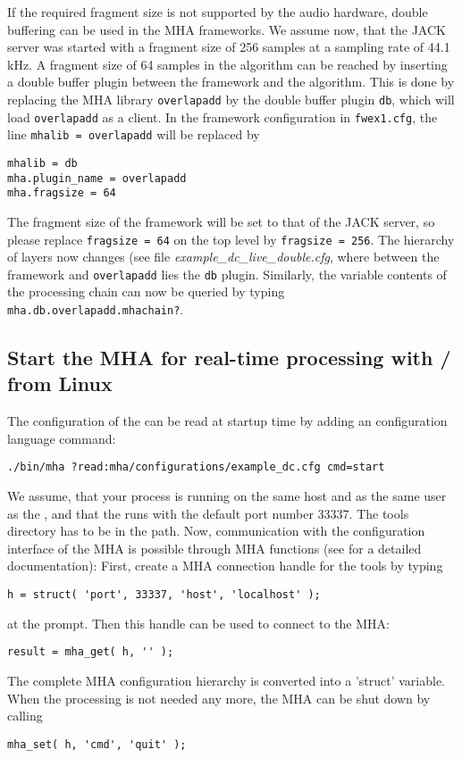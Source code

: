 If the required fragment size is not supported by the audio hardware,
double buffering can be used in the MHA frameworks. We assume now,
that the JACK server was started with a fragment size of 256 samples at
a sampling rate of 44.1 kHz. A fragment size of 64 samples in the algorithm 
can be reached by inserting a double buffer plugin between the framework and the algorithm. This is
done by replacing the MHA library \verb!overlapadd! by the double
buffer plugin \verb!db!, which will load \verb!overlapadd! as a
client. In the framework configuration in \verb!fwex1.cfg!, the line
\verb!mhalib = overlapadd! will be replaced by
\begin{verbatim}
mhalib = db
mha.plugin_name = overlapadd
mha.fragsize = 64
\end{verbatim}
The fragment size of the framework will be set to that of the JACK
server, so please replace \verb!fragsize = 64! on the top level by
\verb!fragsize = 256!. The hierarchy of layers now changes (see 
file \emph{example\_dc\_live\_double.cfg}, where between the framework 
and \verb!overlapadd! lies the \verb!db! plugin.
Similarly, the variable contents of the processing chain can now be
queried by typing \verb!mha.db.overlapadd.mhachain?!.

\subsection{Start the MHA for real-time processing with \Octave{}/ \Matlab{} from Linux}%
%

The configuration of the \mhad{} can be
read at startup time by adding an \mha{} configuration language command:
%
\begin{verbatim}
./bin/mha ?read:mha/configurations/example_dc.cfg cmd=start
\end{verbatim}
%
We assume, that your \Matlab{} process is running on the same host and
as the same user as the \mha{}, and that the \mhad{} runs with the
default port number 33337.
%
The \mha{} \Matlab{} tools directory has to be in the \Matlab{} path.
%
Now, communication with the configuration interface of the MHA is
possible through MHA \Matlab{} functions (see 
for a detailed documentation):
%
First, create a MHA connection handle for the \Matlab{} tools by
typing
\begin{verbatim}
h = struct( 'port', 33337, 'host', 'localhost' );
\end{verbatim}
at the \Matlab{} prompt. Then this handle can be used to connect to
the MHA:
%
\begin{verbatim}
result = mha_get( h, '' );
\end{verbatim}
%
The complete MHA configuration hierarchy is converted into a \Matlab{}
'struct' variable.
%
When the \mha{} processing is not needed any more, the MHA can be shut
down by calling
%
\begin{verbatim}
mha_set( h, 'cmd', 'quit' );
\end{verbatim}


